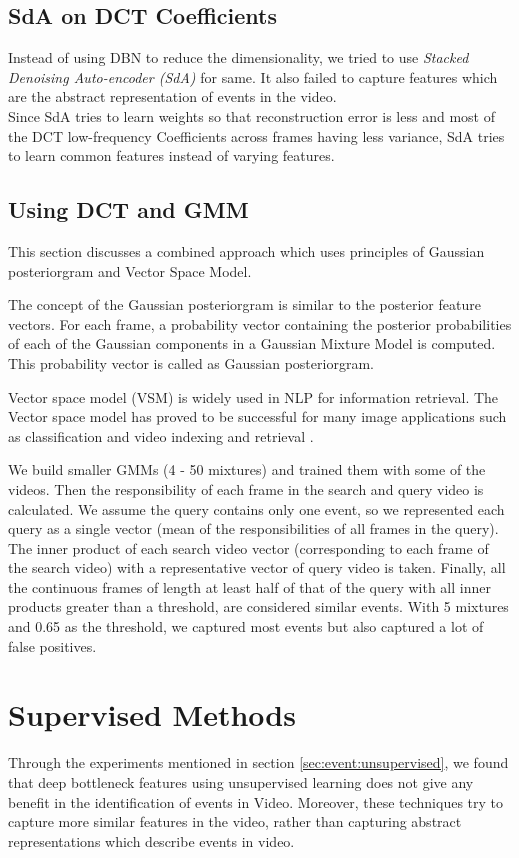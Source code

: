 \subsection{SdA on DCT Coefficients}
Instead of using DBN to reduce the dimensionality, we tried to use \textit{Stacked Denoising Auto-encoder (SdA)} for same. It also failed to capture features which are the abstract representation of events in the video.\\
Since SdA tries to learn weights so that reconstruction error is less and most of the DCT low-frequency Coefficients across frames having less variance, SdA tries to learn common features instead of varying features.\\

\subsection{Using DCT and GMM}
\label{sec:event:dct_gmm}
This section discusses a combined approach which uses principles of Gaussian posteriorgram and Vector Space Model.

The concept of the Gaussian posteriorgram is similar to the posterior feature vectors\citep{zhang2010towards}. For each frame, a probability vector containing the posterior probabilities of each of the Gaussian components in a Gaussian Mixture Model is computed. This probability vector is called as  Gaussian posteriorgram. 

Vector space model (VSM) is widely used in NLP for information retrieval. The Vector space model has proved to be successful for many image applications such as classification and video indexing and retrieval \citep{galmar2007analysis}. 

We build smaller GMMs (4 - 50 mixtures) and trained them with some of the videos. Then the responsibility of each frame in the search and query video is calculated. We assume the query contains only one event, so we represented each query as a single vector (mean of the responsibilities of all frames in the query). The inner product of each search video vector (corresponding to each frame of the search video) with a representative vector of query video is taken. Finally, all the continuous frames of length at least half of that of the query with all inner products greater than a threshold, are considered similar events. With 5 mixtures and 0.65 as the threshold, we captured most events but also captured a lot of false positives.

\section{Supervised Methods}
\label{sec:event:supervised}
Through the experiments mentioned in section  \ref{sec:event:unsupervised}, we found that deep bottleneck features using unsupervised learning does not give any benefit in the identification of events in Video. Moreover, these techniques try to capture more similar features in the video, rather than capturing abstract representations which describe events in video.

